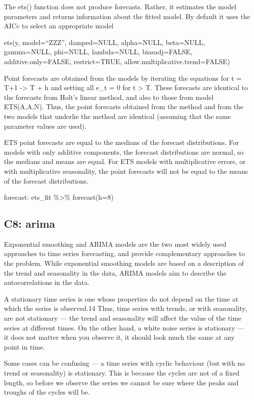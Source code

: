\documentclass[]{book}
\begin{document}
The ets() function does not produce forecasts. Rather, it estimates the
model parameters and returns information about the fitted model. By
default it uses the AICc to select an appropriate model

ets(y, model=``ZZZ'', damped=NULL, alpha=NULL, beta=NULL, gamma=NULL,
phi=NULL, lambda=NULL, biasadj=FALSE, additive.only=FALSE,
restrict=TRUE, allow.multiplicative.trend=FALSE)

Point forecasts are obtained from the models by iterating the equations
for t = T+1 -\textgreater{} T + h and setting all e\_t = 0 for t
\textgreater{} T. These forecasts are identical to the forecasts from
Holt's linear method, and also to those from model ETS(A,A,N). Thus, the
point forecasts obtained from the method and from the two models that
underlie the method are identical (assuming that the same parameter
values are used).

ETS point forecasts are equal to the medians of the forecast
distributions. For models with only additive components, the forecast
distributions are normal, so the medians and means are equal. For ETS
models with multiplicative errors, or with multiplicative seasonality,
the point forecasts will not be equal to the means of the forecast
distributions.

forecast: ets\_fit \%\textgreater{}\% forecast(h=8)

\subsection{C8: arima}\label{c8-arima}

Exponential smoothing and ARIMA models are the two most widely used
approaches to time series forecasting, and provide complementary
approaches to the problem. While exponential smoothing models are based
on a description of the trend and seasonality in the data, ARIMA models
aim to describe the autocorrelations in the data.

A stationary time series is one whose properties do not depend on the
time at which the series is observed.14 Thus, time series with trends,
or with seasonality, are not stationary --- the trend and seasonality
will affect the value of the time series at different times. On the
other hand, a white noise series is stationary --- it does not matter
when you observe it, it should look much the same at any point in time.

Some cases can be confusing --- a time series with cyclic behaviour (but
with no trend or seasonality) is stationary. This is because the cycles
are not of a fixed length, so before we observe the series we cannot be
sure where the peaks and troughs of the cycles will be.
\end{document}
